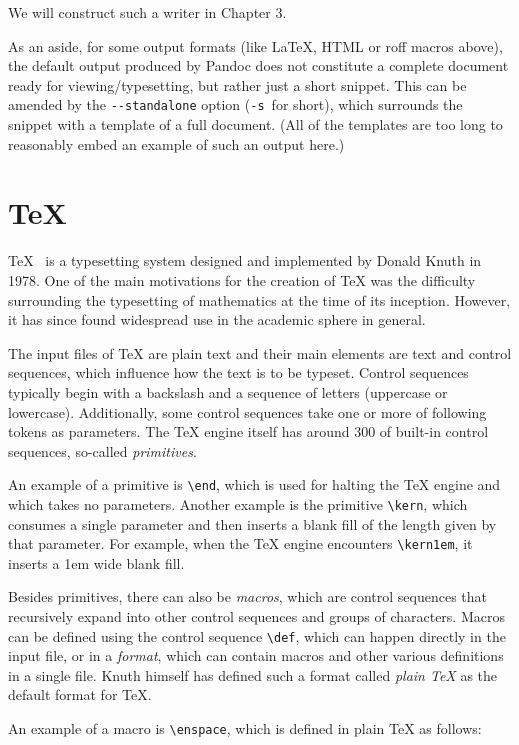 \documentclass[
  digital,     %
  oneside,     %
  nosansbold,  %
  nocolorbold, %
  lof,         %
  nolot,       %
]{fithesis4}
\newcommand\macro[1]{\texttt{\textbackslash{}{#1}}}
\begin{document}
\noindent
We will construct such a writer in Chapter 3.

As an aside, for some output formats (like \LaTeX{}, HTML or roff macros above), the default output produced by Pandoc does not constitute a complete document ready for viewing/typesetting, but rather just a short snippet. This can be amended by the \texttt{-{}-standalone} option (\texttt{-s}~for short), which surrounds the snippet with a template of a full document. (All of the templates are too long to reasonably embed an example of such an output here.)

\section{\TeX{}}
\TeX{}~\cite{texbook} is a typesetting system designed and implemented by Donald Knuth in 1978. One of the main motivations for the creation of \TeX{} was the difficulty surrounding the typesetting of mathematics at the time of its inception. However, it has since found widespread use in the academic sphere in general.

The input files of \TeX{} are plain text and their main elements are text and control sequences, which influence how the text is to be typeset. Control sequences typically begin with a backslash and a sequence of letters (uppercase or lowercase). Additionally, some control sequences take one or more of following tokens as parameters. The \TeX{} engine itself has around 300 of built-in control sequences, so-called \textit{primitives}. \cite{olsak-tbn}

An example of a primitive is \macro{end}, which is used for halting the \TeX{} engine and which takes no parameters. Another example is the primitive \macro{kern}, which consumes a single parameter and then inserts a blank fill of the length given by that parameter. For example, when the \TeX{} engine encounters \macro{kern1em}, it inserts a 1em wide blank fill.

Besides primitives, there can also be \textit{macros}, which are control sequences that recursively expand into other control sequences and groups of characters. Macros can be defined using the control sequence \macro{def}, which can happen directly in the input file, or in a \textit{format}, which can contain macros and other various definitions in a single file. Knuth himself has defined such a format called \textit{plain \TeX{}} as the default format for \TeX{}.

An example of a macro is \macro{enspace}, which is defined in plain \TeX{} as follows:
\end{document}
